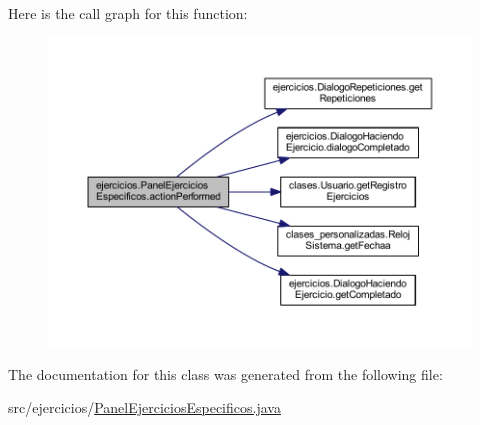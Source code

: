 Here is the call graph for this function\+:
\nopagebreak
\begin{figure}[H]
\begin{center}
\leavevmode
\includegraphics[width=350pt]{classejercicios_1_1_panel_ejercicios_especificos_a881689ee370e508005fda67b729e23f7_cgraph}
\end{center}
\end{figure}


The documentation for this class was generated from the following file\+:\begin{DoxyCompactItemize}
\item 
src/ejercicios/\mbox{\hyperlink{_panel_ejercicios_especificos_8java}{Panel\+Ejercicios\+Especificos.\+java}}\end{DoxyCompactItemize}
